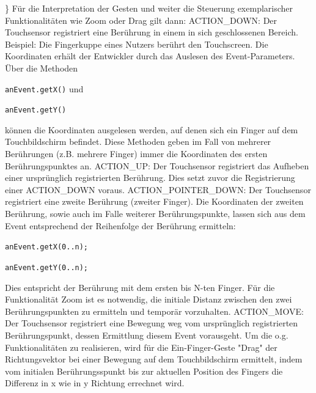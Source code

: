 \documentclass[12pt,oneside,a4paper,bibtotoc,liststotoc]{scrreprt}
\begin{document}
\}\newline \newline
Für die Interpretation der Gesten und weiter die Steuerung exemplarischer Funktionalitäten wie Zoom oder Drag gilt dann:\newline\newline
ACTION\_DOWN: Der Touchsensor registriert eine Berührung in einem in sich geschlossenen Bereich.\newline
Beispiel: Die Fingerkuppe eines Nutzers berührt den Touchscreen. Die Koordinaten erhält der Entwickler durch das Auslesen des Event-Parameters. Über die Methoden\newline
\centerline{\texttt{anEvent.getX()} und}  \newline
\centerline{\texttt{anEvent.getY()}}\newline
können die Koordinaten ausgelesen werden, auf denen sich ein Finger auf dem Touchbildschirm befindet. Diese Methoden geben im Fall von mehrerer Berührungen (z.B. mehrere Finger) immer die Koordinaten des ersten Berührungspunktes an.\newline\newline
ACTION\_UP: Der Touchsensor registriert das Aufheben einer ursprünglich registrierten Berührung. Dies setzt zuvor die Registrierung einer ACTION\_DOWN voraus.\newline\newline
ACTION\_POINTER\_DOWN:
Der Touchsensor registriert eine zweite Berührung (zweiter Finger). Die Koordinaten der zweiten Berührung, sowie auch im Falle weiterer Berührungspunkte, lassen sich aus dem Event entsprechend der Reihenfolge der Berührung ermitteln:
\centerline{\texttt{anEvent.getX(0..n);}}\newline
\centerline{\texttt{anEvent.getY(0..n);}}\newline
Dies entspricht der Berührung mit dem ersten bis N-ten Finger. Für die Funktionalität Zoom ist es notwendig, die initiale Distanz zwischen den zwei Berührungspunkten zu ermitteln und temporär vorzuhalten.\newline\newline
ACTION\_MOVE: Der Touchsensor registriert eine Bewegung weg vom ursprünglich registrierten Berührungspunkt, dessen Ermittlung diesem Event vorausgeht. Um die o.g. Funktionalitäten zu realisieren, wird für die Ein-Finger-Geste "Drag" der Richtungsvektor bei einer Bewegung auf dem Touchbildschirm ermittelt, indem vom initialen Berührungsspunkt bis zur aktuellen Position des Fingers die Differenz in x wie in y Richtung errechnet wird.
\end{document}
